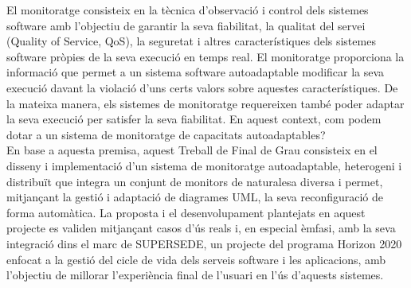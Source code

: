 \documentclass[
11pt, %
catalan, %
singlespacing, %
headsepline, %
table
]{MastersDoctoralThesis} %
\begin{document}
\begin{Abstracte}
El monitoratge consisteix en la tècnica d'observació i control dels sistemes software amb l'objectiu de garantir la seva fiabilitat, la qualitat del servei (Quality of Service, QoS), la seguretat i altres característiques dels sistemes software pròpies de la seva execució en temps real. El monitoratge proporciona la informació que permet a un sistema software autoadaptable modificar la seva execució davant la violació d'uns certs valors sobre aquestes característiques. De la mateixa manera, els sistemes de monitoratge requereixen també poder adaptar la seva execució per satisfer la seva fiabilitat. En aquest context, com podem dotar a un sistema de monitoratge de capacitats autoadaptables?\\

En base a aquesta premisa, aquest Treball de Final de Grau consisteix en el disseny i implementació d'un sistema de monitoratge autoadaptable, heterogeni i distribuït que integra un conjunt de monitors de naturalesa diversa i permet, mitjançant la gestió i adaptació de diagrames UML, la seva reconfiguració de forma automàtica. La proposta i el desenvolupament plantejats en aquest projecte es validen mitjançant casos d'ús reals i, en especial èmfasi, amb la seva integració dins el marc de SUPERSEDE, un projecte del programa Horizon 2020 enfocat a la gestió del cicle de vida dels serveis software i les aplicacions, amb l'objectiu de millorar l'experiència final de l'usuari en l'ús d'aquests sistemes. 
\end{Abstracte}




\tableofcontents %
\end{document}
